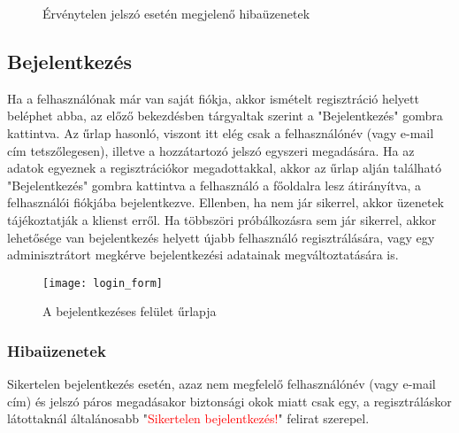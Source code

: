 \begin{figure}[H]
	\centering
	\hspace{5pt}
	\hspace{5pt}
	\caption{Érvénytelen jelszó esetén megjelenő hibaüzenetek}
	\label{fig:register_form_invalid_password}
\end{figure}

\subsection{Bejelentkezés}

Ha a felhasználónak már van saját fiókja, akkor ismételt regisztráció helyett beléphet abba, az előző bekezdésben tárgyaltak szerint a "Bejelentkezés" gombra kattintva. Az űrlap hasonló, viszont itt elég csak a felhasználónév (vagy e-mail cím tetszőlegesen), illetve a hozzátartozó jelszó egyszeri megadására. Ha az adatok egyeznek a regisztrációkor megadottakkal, akkor az űrlap alján található "Bejelentkezés" gombra kattintva a felhasználó a főoldalra lesz átirányítva, a felhasználói fiókjába bejelentkezve. Ellenben, ha nem jár sikerrel, akkor üzenetek tájékoztatják a klienst erről. Ha többszöri próbálkozásra sem jár sikerrel, akkor lehetősége van bejelentkezés helyett újabb felhasználó regisztrálására, vagy egy adminisztrátort megkérve bejelentkezési adatainak megváltoztatására is.

\begin{figure}[H]
	\centering
	\texttt{[image: login\_form]}
	\caption{A bejelentkezéses felület űrlapja}
	\label{fig:login_form}
\end{figure}

\subsubsection{Hibaüzenetek}

Sikertelen bejelentkezés esetén, azaz nem megfelelő felhasználónév (vagy e-mail cím) és jelszó páros megadásakor biztonsági okok miatt csak egy, a regisztráláskor látottaknál általánosabb "\textcolor{red}{Sikertelen bejelentkezés!}" felirat szerepel.

